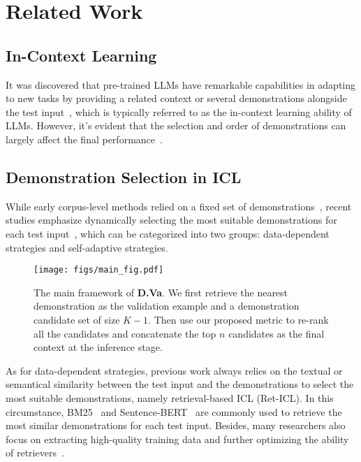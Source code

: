 \section{Related Work}
\subsection{In-Context Learning}
    It was discovered that pre-trained LLMs have remarkable capabilities in adapting to new tasks by providing a related context or several demonstrations alongside the test input~\citep{gpt3,dong-etal-2024-survey,luo2024incontext}, which is typically referred to as the in-context learning ability of LLMs. However, it's evident that the selection and order of demonstrations can largely affect the final performance~\cite{liu-etal-2022-makes,lu-etal-2022-fantastically}.

    \subsection{Demonstration Selection in ICL}
     While early corpus-level methods relied on a fixed set of demonstrations~\cite{gpt3,shin-etal-2020-autoprompt,gao-etal-2021-making,jiang-etal-2021-know,sorensen-etal-2022-information}, recent studies emphasize dynamically selecting the most suitable demonstrations for each test input~\cite{luo2024incontext}, which can be categorized into two groups: data-dependent strategies and self-adaptive strategies.

    \begin{figure*}[h]
        \centering
        \texttt{[image: figs/main\_fig.pdf]}
        \caption{The main framework of \textbf{D.Va}. We first retrieve the nearest demonstration as the validation example and a demonstration candidate set of size $K-1$. Then use our proposed metric to re-rank all the candidates and concatenate the top $n$ candidates as the final context at the inference stage.}
        \label{fig:main}
    \end{figure*}

    As for data-dependent strategies, previous work always relies on the textual or semantical similarity between the test input and the demonstrations to select the most suitable demonstrations, namely retrieval-based ICL (Ret-ICL). In this circumstance, BM25~\citep{bm25} and Sentence-BERT~\citep{reimers-gurevych-2019-sentence} are commonly used to retrieve the most similar demonstrations for each test input. Besides, many researchers also focus on extracting high-quality training data and further optimizing the ability of retrievers~\cite{ceil,li-etal-2023-unified,luo2023dricldemonstrationretrievedincontextlearning,wang-etal-2024-learning}.

